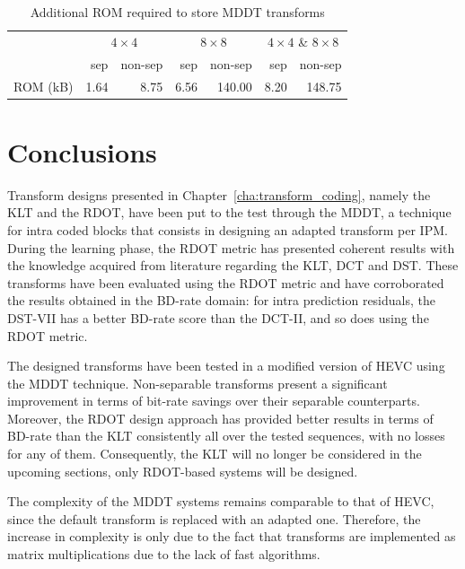 \documentclass[11pt,a4paper,openright,twoside]{book}
\numberwithin{equation}{section} %
\numberwithin{figure}{section} %
\numberwithin{table}{section} %
\begin{document}
\begin{table}[tb]
	\centering
	\small
	\begin{tabular}{l|rr|rr|rr}
		& \multicolumn{2}{c|}{$4\times4$}
		& \multicolumn{2}{c|}{$8\times8$}
		& \multicolumn{2}{c}{$4\times4$ \& $8\times8$} \\
		& sep & non-sep & sep & non-sep & sep & non-sep \\
		\hline\hline
		\acs{ROM} (kB) & 1.64 & 8.75 & 6.56 & 140.00 & 8.20 & 148.75 \\
	\end{tabular}
	\caption{Additional \acs{ROM} required to store \acs{MDDT} transforms}
	\label{tab:mddt_rom}
\end{table}

\section{Conclusions}
\label{sec:conclusions}

Transform designs presented in Chapter~\ref{cha:transform_coding}, namely the
\ac{KLT} and the \ac{RDOT}, have been put to the test through the \ac{MDDT}, a
technique for intra coded blocks that consists in designing an adapted
transform per \ac{IPM}.
During the learning phase, the \ac{RDOT} metric has presented coherent results
with the knowledge acquired from literature regarding the \ac{KLT}, \ac{DCT}
and \ac{DST}.
These transforms have been evaluated using the \ac{RDOT} metric and have
corroborated the results obtained in the \ac{BD}-rate domain:
for intra prediction residuals, the \ac{DST}-VII has a better \ac{BD}-rate
score than the \ac{DCT}-II, and so does using the \ac{RDOT} metric.

The designed transforms have been tested in a modified version of \ac{HEVC}
using the \ac{MDDT} technique.
Non-separable transforms present a significant improvement in terms of
bit-rate savings over their separable counterparts.
Moreover, the \ac{RDOT} design approach has provided better results in terms
of \ac{BD}-rate than the \ac{KLT} consistently all over the tested sequences,
with no losses for any of them.
Consequently, the \ac{KLT} will no longer be considered in the upcoming
sections, only \ac{RDOT}-based systems will be designed.

The complexity of the \ac{MDDT} systems remains comparable to that of
\ac{HEVC}, since the default transform is replaced with an adapted one.
Therefore, the increase in complexity is only due to the fact that transforms
are implemented as matrix multiplications due to the lack of fast algorithms.
\end{document}
